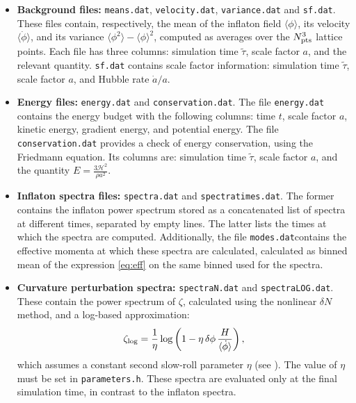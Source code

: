 \documentclass[aps, nofootinbib,superscriptaddress, preprintnumbers, longbibliography]{article}
\begin{document}
\begin{itemize}
    \item \textbf{Background files:} \texttt{means.dat}, \texttt{velocity.dat}, \texttt{variance.dat} and \texttt{sf.dat}. These files contain, respectively, the mean of the inflaton field $\langle \phi \rangle$, its velocity $\langle \dot\phi \rangle$, and its variance $\langle \phi^2 \rangle - \langle \phi \rangle^2$, computed as averages over the $N^3_{\rm pts}$ lattice points. Each file has three columns: simulation time $\tilde{\tau}$, scale factor $a$, and the relevant quantity. \texttt{sf.dat} contains scale factor information: simulation time $\tilde{\tau}$, scale factor $a$, and Hubble rate $\dot{a}/a$.

    \item \textbf{Energy files:} \texttt{energy.dat} and \texttt{conservation.dat}. The file \texttt{energy.dat} contains the energy budget with the following columns: time $t$, scale factor $a$, kinetic energy, gradient energy, and potential energy. The file \texttt{conservation.dat} provides a check of energy conservation, using the Friedmann equation. Its columns are: simulation time $\tilde{\tau}$, scale factor $a$, and the quantity $E = \frac{3\mathcal{H}^2}{\rho a^2}$.

    \item \textbf{Inflaton spectra files:} \texttt{spectra.dat} and \texttt{spectratimes.dat}. The former contains the inflaton power spectrum stored as a concatenated list of spectra at different times, separated by empty lines. The latter lists the times at which the spectra are computed. Additionally, the file \texttt{modes.dat}contains the effective momenta at which these spectra are calculated, calculated as binned mean of the expression \cref{eq:eff} on the same binned used for the spectra.

    \item \textbf{Curvature perturbation spectra:} \texttt{spectraN.dat} and \texttt{spectraLOG.dat}. These contain the power spectrum of $\zeta$, calculated using the nonlinear $\delta N$ method, and a log-based approximation:
    \begin{equation}
        \zeta_{\rm log} = \frac{1}{\eta} \log\left(1 - \eta\, \delta\phi\, \frac{H}{\langle \dot\phi \rangle} \right),
    \end{equation}
    which assumes a constant second slow-roll parameter $\eta$ (see \cite{USR2}). The value of $\eta$ must be set in \texttt{parameters.h}. These spectra are evaluated only at the final simulation time, in contrast to the inflaton spectra.


\end{itemize}
\end{document}
